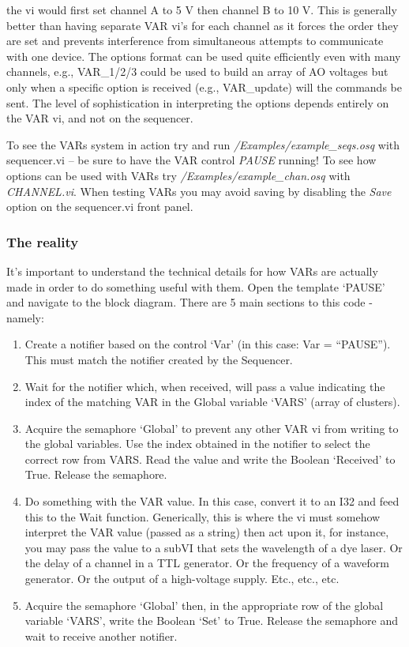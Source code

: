\documentclass[10pt,a4paper]{article}
\begin{document}
\noindent the vi would first set channel A to 5 V then channel B to 10 V.  This is generally better than having separate VAR vi's for each channel as it forces the order they are set and prevents interference from simultaneous attempts to communicate with one device.  The options format can be used quite efficiently even with many channels, e.g., VAR\_1/2/3 could be used to build an array of AO voltages but only when a specific option is received (e.g., VAR\_update) will the commands be sent.  The level of sophistication in interpreting the options depends entirely on the VAR vi, and not on the sequencer. 

To see the VARs system in action try and run \emph{/Examples/example\_seqs.osq} with sequencer.vi -- be sure to have the VAR control \emph{PAUSE} running!  To see how options can be used with VARs try \emph{/Examples/example\_chan.osq} with \emph{CHANNEL.vi}. When testing VARs you may avoid saving by disabling the \emph{Save} option on the sequencer.vi front panel.

\subsubsection{The reality}

It's important to understand the technical details for how VARs are actually made in order to do something useful with them.  Open the template `PAUSE' and navigate to the block diagram.  There are 5 main sections to this code - namely:

\begin{enumerate}
	\item %
	Create a notifier based on the control `Var' (in this case: Var = ``PAUSE'').  This must match the notifier created by the Sequencer.
	\item %
	Wait for the notifier which, when received, will pass a value indicating the index of the matching VAR in the Global variable `VARS' (array of clusters).
	\item %
	Acquire the semaphore `Global' to prevent any other VAR vi from writing to the global variables.  Use the index obtained in the notifier to select the correct row from VARS.  Read the value and write the Boolean `Received' to True.  Release the semaphore.
	\item %
	Do something with the VAR value.  In this case, convert it to an I32 and feed this to the  Wait function.  Generically, this is where the vi must somehow interpret the VAR value (passed as a string) then act upon it, for instance, you may pass the value to a subVI that sets the wavelength of a dye laser. Or the delay of a channel in a TTL generator. Or the frequency of a waveform generator. Or the output of a high-voltage supply. Etc., etc., etc.
	\item %
	Acquire the semaphore `Global' then, in the appropriate row of the global variable `VARS', write the Boolean `Set' to True.   Release the semaphore and wait to receive another notifier.
\end{enumerate} 
\end{document}
